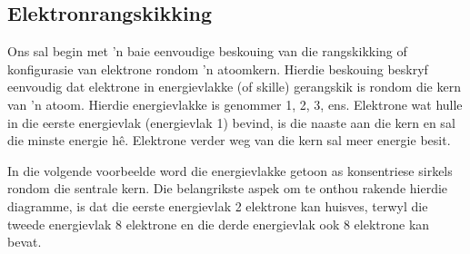 \subsection*{Elektronrangskikking}
\nopagebreak
\label{m38741*id9722401}
Ons sal begin met 'n baie eenvoudige beskouing van die rangskikking of konfigurasie van elektrone rondom 'n atoomkern. Hierdie beskouing beskryf eenvoudig dat elektrone in energievlakke (of skille) gerangskik is rondom die kern van  'n atoom. Hierdie energievlakke is genommer 1, 2, 3, ens. Elektrone wat hulle in die eerste energievlak (energievlak 1) bevind, is die naaste aan die kern en sal die minste energie h\^{e}. Elektrone verder weg van die kern sal meer energie besit.\par 
\label{m38741*id259357}In die volgende voorbeelde word die energievlakke getoon as konsentriese sirkels rondom die sentrale kern. Die belangrikste aspek om te onthou rakende hierdie diagramme, is dat die eerste energievlak 2 elektrone kan huisves, terwyl die tweede energievlak 8 elektrone en die derde energievlak ook 8 elektrone kan bevat.\par 
